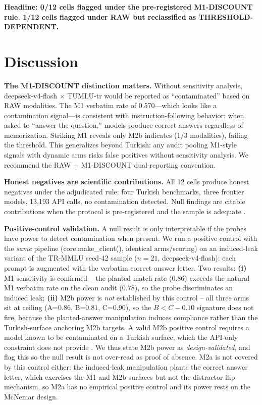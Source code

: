 \documentclass[letterpaper]{article}
\begin{document}
\textbf{Headline: 0/12 cells flagged under the pre-registered M1-DISCOUNT rule. 1/12 cells flagged under RAW but reclassified as THRESHOLD-DEPENDENT.}

\section{Discussion}

\textbf{The M1-DISCOUNT distinction matters.} Without sensitivity analysis, deepseek-v4-flash $\times$ TUMLU-tr would be reported as ``contaminated'' based on RAW modalities. The M1 verbatim rate of 0.570---which looks like a contamination signal---is consistent with instruction-following behavior: when asked to ``answer the question,'' models produce correct answers regardless of memorization. Striking M1 reveals only M2b indicates (1/3 modalities), failing the threshold. This generalizes beyond Turkish: any audit pooling M1-style signals with dynamic arms risks false positives without sensitivity analysis. We recommend the RAW + M1-DISCOUNT dual-reporting convention.

\textbf{Honest negatives are scientific contributions.} All 12 cells produce honest negatives under the adjudicated rule: four Turkish benchmarks, three frontier models, 13,193 API calls, no contamination detected. Null findings are citable contributions when the protocol is pre-registered and the sample is adequate \cite{pineau2020reproducibility}.

\textbf{Positive-control validation.} A null result is only interpretable if the probes have power to detect contamination when present. We run a positive control with the \emph{same} pipeline (core.make\_client(), identical arms/scoring) on an induced-leak variant of the TR-MMLU seed-42 sample ($n=21$, deepseek-v4-flash): each prompt is augmented with the verbatim correct answer letter. Two results: \textbf{(i)} M1 sensitivity is confirmed -- the planted-match rate ($0.86$) exceeds the natural M1 verbatim rate on the clean audit ($0.78$), so the probe discriminates an induced leak; \textbf{(ii)} M2b power is \emph{not} established by this control -- all three arms sit at ceiling (A=$0.86$, B=$0.81$, C=$0.90$), so the $B<C-0.10$ signature does not fire, because the planted-answer manipulation induces compliance rather than the Turkish-surface anchoring M2b targets. A valid M2b positive control requires a model known to be contaminated on a Turkish surface, which the API-only constraint does not provide \cite{oren2023proving}. We thus state M2b power as \emph{design-validated}, and flag this so the null result is not over-read as proof of absence. M2a is not covered by this control either: the induced-leak manipulation plants the correct answer letter, which exercises the M1 and M2b surfaces but not the distractor-flip mechanism, so M2a has no empirical positive control and its power rests on the McNemar design.
\end{document}
